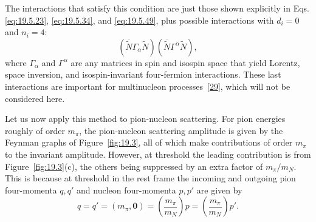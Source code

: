 

The interactions that satisfy this condition are just those shown explicitly in Eqs. \eqref{eq:19.5.23}, \eqref{eq:19.5.34}, and \eqref{eq:19.5.49}, plus possible interactions with $d_i=0$ and $n_i=4$:
\begin{equation}
\left(\overline{\widetilde N}\Gamma_\alpha\widetilde N\right)
\left(\overline{\widetilde N}\Gamma^\alpha\widetilde N\right),
\tag{19.5.56}\label{eq:19.5.56}
\end{equation}
where $\Gamma_\alpha$ and $\Gamma^\alpha$ are any matrices in spin and isospin space that yield Lorentz, space inversion, and isospin-invariant four-fermion interactions. These last interactions are important for multinucleon processes~\hyperref[ch19-ref-29]{[29]}, which will not be considered here.

Let us now apply this method to pion-nucleon scattering. For pion energies roughly of order $m_\pi$, the pion-nucleon scattering amplitude is given by the Feynman graphs of Figure~\ref{fig:19.3}, all of which make contributions of order $m_\pi$ to the invariant amplitude. However, at threshold the leading contribution is from Figure~\ref{fig:19.3}(c), the others being suppressed by an extra factor of $m_\pi/m_N$. This is because at threshold in the rest frame the incoming and outgoing pion four-momenta $q,q'$ and nucleon four-momenta $p,p'$ are given by
\begin{equation}
q=q'=(m_\pi,\boldsymbol{0})
=\left(\frac{m_\pi}{m_N}\right)p
=\left(\frac{m_\pi}{m_N}\right)p'.
\tag{19.5.57}\label{eq:19.5.57}
\end{equation}

